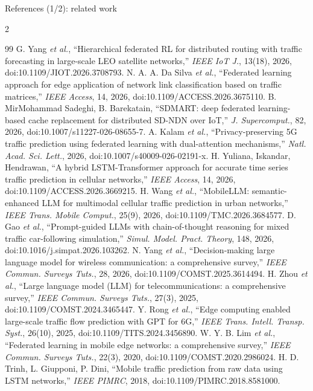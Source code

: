 \documentclass[11pt,aspectratio=169]{beamer}
\begin{document}
\begin{frame}{References (1/2): related work}
  \begin{multicols}{2}
  \begin{thebibliography}{99}
    \setlength{\itemsep}{2pt}\setlength{\parskip}{0pt}
     G. Yang \emph{et al.}, ``Hierarchical federated RL for distributed routing with traffic forecasting in large-scale LEO satellite networks,'' \emph{IEEE IoT J.}, 13(18), 2026, doi:10.1109/JIOT.2026.3708793.
     N. A. A. Da Silva \emph{et al.}, ``Federated learning approach for edge application of network link classification based on traffic matrices,'' \emph{IEEE Access}, 14, 2026, doi:10.1109/ACCESS.2026.3675110.
     B. MirMohammad Sadeghi, B. Barekatain, ``SDMART: deep federated learning-based cache replacement for distributed SD-NDN over IoT,'' \emph{J. Supercomput.}, 82, 2026, doi:10.1007/s11227-026-08655-7.
     A. Kalam \emph{et al.}, ``Privacy-preserving 5G traffic prediction using federated learning with dual-attention mechanisms,'' \emph{Natl. Acad. Sci. Lett.}, 2026, doi:10.1007/s40009-026-02191-x.
     H. Yuliana, Iskandar, Hendrawan, ``A hybrid LSTM-Transformer approach for accurate time series traffic prediction in cellular networks,'' \emph{IEEE Access}, 14, 2026, doi:10.1109/ACCESS.2026.3669215.
     H. Wang \emph{et al.}, ``MobileLLM: semantic-enhanced LLM for multimodal cellular traffic prediction in urban networks,'' \emph{IEEE Trans. Mobile Comput.}, 25(9), 2026, doi:10.1109/TMC.2026.3684577.
     D. Gao \emph{et al.}, ``Prompt-guided LLMs with chain-of-thought reasoning for mixed traffic car-following simulation,'' \emph{Simul. Model. Pract. Theory}, 148, 2026, doi:10.1016/j.simpat.2026.103262.
     N. Yang \emph{et al.}, ``Decision-making large language model for wireless communication: a comprehensive survey,'' \emph{IEEE Commun. Surveys Tuts.}, 28, 2026, doi:10.1109/COMST.2025.3614494.
     H. Zhou \emph{et al.}, ``Large language model (LLM) for telecommunications: a comprehensive survey,'' \emph{IEEE Commun. Surveys Tuts.}, 27(3), 2025, doi:10.1109/COMST.2024.3465447.
     Y. Rong \emph{et al.}, ``Edge computing enabled large-scale traffic flow prediction with GPT for 6G,'' \emph{IEEE Trans. Intell. Transp. Syst.}, 26(10), 2025, doi:10.1109/TITS.2024.3456890.
     W. Y. B. Lim \emph{et al.}, ``Federated learning in mobile edge networks: a comprehensive survey,'' \emph{IEEE Commun. Surveys Tuts.}, 22(3), 2020, doi:10.1109/COMST.2020.2986024.
     H. D. Trinh, L. Giupponi, P. Dini, ``Mobile traffic prediction from raw data using LSTM networks,'' \emph{IEEE PIMRC}, 2018, doi:10.1109/PIMRC.2018.8581000.
  \end{thebibliography}
  \end{multicols}
\end{frame}
\end{document}

